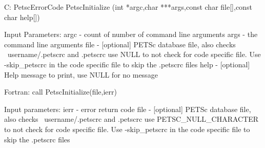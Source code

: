 C:
PetscErrorCode  PetscInitialize
   (int *argc,char ***args,const char file[],const char help[])

Input Parameters:
argc - count of number of command line arguments
args - the command line arguments
file - [optional] PETSc database file, also checks ~username/.petscrc
    and .petscrc use NULL to not check for code specific file. Use
    -skip_petscrc in the code specific file to skip the .petscrc files
help - [optional] Help message to print, use NULL for no message

Fortran:
call PetscInitialize(file,ierr)

Input parameters:
ierr - error return code
file - [optional] PETSc database file, 
    also checks ~username/.petscrc and .petscrc 
    use PETSC_NULL_CHARACTER to not check for code specific file.
    Use -skip_petscrc in the code specific file to skip the .petscrc files
